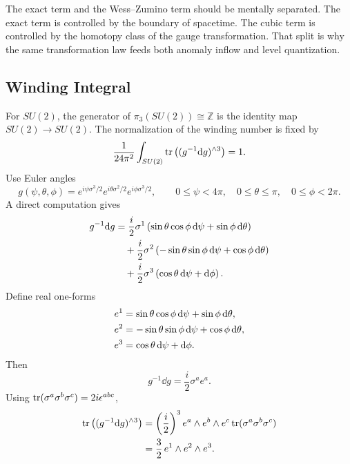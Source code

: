 The exact term and the Wess--Zumino term should be mentally separated. The exact term is controlled by the boundary of spacetime. The cubic term is controlled by the homotopy class of the gauge transformation. That split is why the same transformation law feeds both anomaly inflow and level quantization.

\subsection{Winding Integral}
\label{subsec:dense-euler-su2}

For $SU(2)$, the generator of $\pi_3(SU(2))\cong\mathbb Z$ is the identity map $SU(2)\to SU(2)$. The normalization of the winding number is fixed by
\begin{equation}
  \frac{1}{24\pi^2}
  \int_{SU(2)}
  \operatorname{tr}\left((g^{-1}\mathrm{d} g)^{\wedge 3}\right)
  =
  1.
  \label{eq:dense-su2-normalization-goal}
\end{equation}
Use Euler angles
\begin{equation}
  g(\psi,\theta,\phi)
  =
  e^{i\psi\sigma^3/2}
  e^{i\theta\sigma^2/2}
  e^{i\phi\sigma^3/2},
  \qquad
  0\leq\psi<4\pi,\quad
  0\leq\theta\leq\pi,\quad
  0\leq\phi<2\pi.
  \label{eq:dense-euler-param}
\end{equation}
A direct computation gives
\begin{align}
  g^{-1}\mathrm{d} g
  &=
  \frac{i}{2}\sigma^1
  \left(\sin\theta\cos\phi\,\mathrm{d}\psi+\sin\phi\,\mathrm{d}\theta\right)
  \notag\\
  &\quad
  +
  \frac{i}{2}\sigma^2
  \left(-\sin\theta\sin\phi\,\mathrm{d}\psi+\cos\phi\,\mathrm{d}\theta\right)
  \notag\\
  &\quad
  +
  \frac{i}{2}\sigma^3
  \left(\cos\theta\,\mathrm{d}\psi+\mathrm{d}\phi\right).
  \label{eq:dense-ginv-dg-euler}
\end{align}
Define real one-forms
\begin{align}
  e^1&=\sin\theta\cos\phi\,\mathrm{d}\psi+\sin\phi\,\mathrm{d}\theta,
  \notag\\
  e^2&=-\sin\theta\sin\phi\,\mathrm{d}\psi+\cos\phi\,\mathrm{d}\theta,
  \notag\\
  e^3&=\cos\theta\,\mathrm{d}\psi+\mathrm{d}\phi.
  \label{eq:dense-left-invariant-forms}
\end{align}
Then
\begin{equation}
  g^{-1}\dd g=\frac{i}{2}\sigma^a e^a.
  \label{eq:dense-ginv-dg-compact}
\end{equation}
Using $\operatorname{tr}(\sigma^a\sigma^b\sigma^c)=2i\epsilon^{abc}$,
\begin{align}
  \operatorname{tr}\left((g^{-1}\mathrm{d} g)^{\wedge 3}\right)
  &=
  \left(\frac{i}{2}\right)^3
  e^a\wedge e^b\wedge e^c
  \operatorname{tr}(\sigma^a\sigma^b\sigma^c)
  \notag\\
  &=
  \frac32\,e^1\wedge e^2\wedge e^3.
  \label{eq:dense-wz-e-forms}
\end{align}
